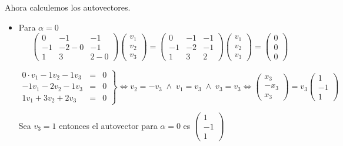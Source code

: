 \begin{enumerate}
    Ahora calculemos los autovectores.

    \begin{itemize}

	\item Para $\alpha=0$
	    $$
	    \begin{pmatrix}
		0 & -1 & -1 \\
		-1 & -2-0 & -1 \\
		1 & 3 & 2-0
	    \end{pmatrix}  
	    \begin{pmatrix}
		v_1 \\
		v_2 \\
		v_3
	    \end{pmatrix} = 
	    \begin{pmatrix}
		0 & -1 & -1 \\
		-1 & -2 & -1 \\
		1 & 3 & 2
	    \end{pmatrix}  
	    \begin{pmatrix}
		v_1 \\
		v_2 \\
		v_3
	    \end{pmatrix} = 
	    \begin{pmatrix}
		0 \\
		0 \\
		0	
	    \end{pmatrix} 
	    $$

	    $$\left.\begin{array}{rcl}
		    0\cdot v_1 -1v_2 -1v_3&=&0\\
			    -1v_1-2v_2-1v_3&=&0\\
			    1v_1+3v_2+2v_3&=&0
		\end{array}\right\} \Longleftrightarrow v_2=-v_3 \; \land \; v_1=v_3 \;\land \; v_3=v_3  \Longleftrightarrow  
		\begin{pmatrix}
		    x_3 \\
		    -x_3 \\
		    x_3
		\end{pmatrix}=v_3
		\begin{pmatrix}
		    1 \\
		    -1 \\
		    1 
		\end{pmatrix}
		$$

		Sea $v_3=1$ entonces el autovector para $\alpha=0$ es
		$\begin{pmatrix}
		    1 \\
		    -1 \\
		    1 
		\end{pmatrix}$\\\\


\end{itemize}
\end{enumerate}
